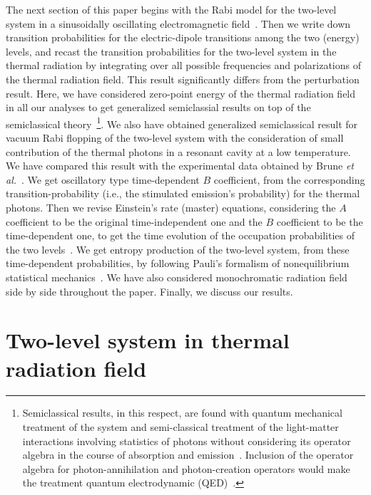 \documentclass[aps,pra,twocolumn,showpacs,preprintnumbers,amsmath,amssymb,footinbib]{revtex4}
\begin{document}
The next section of this paper begins with the Rabi model for the two-level system in a sinusoidally oscillating electromagnetic field~\cite{Rabi,Rabi2,Griffiths,Sakurai}. Then we write down transition probabilities for the electric-dipole transitions among the two (energy) levels, and recast the transition probabilities for the two-level system in the thermal radiation by integrating over all possible frequencies and polarizations of the thermal radiation field. This result significantly differs from the perturbation result. Here, we have considered zero-point energy of the thermal radiation field in all our analyses to get generalized semiclassial results on top of the semiclassical theory~\footnote{Semiclassical results, in this respect, are found with quantum mechanical treatment of the system and semi-classical treatment of the light-matter interactions involving statistics of photons without considering its operator algebra in the course of absorption and emission~\cite{Griffiths,Sakurai}. Inclusion of the operator algebra for photon-annihilation and photon-creation operators would make the treatment quantum electrodynamic (QED)~\cite{Jaynes}.}. We also have obtained generalized semiclassical result for vacuum Rabi flopping of the two-level system with the consideration of small contribution of the thermal photons in a resonant cavity at a low temperature. We have compared this result with the experimental data obtained by Brune \textit{et al.}~\cite{Brune}. We get oscillatory type time-dependent $B$ coefficient, from the corresponding transition-probability (i.e., the stimulated emission's probability) for the thermal photons. Then we revise Einstein's rate (master) equations, considering the $A$ coefficient to be the original time-independent one and the $B$ coefficient to be the time-dependent one, to get the time evolution of the occupation probabilities of the two levels~\cite{Einstein}. We get entropy production of the two-level system, from these time-dependent probabilities, by following Pauli's formalism of nonequilibrium statistical mechanics~\cite{Pauli,Feynman}. We have also considered monochromatic radiation field side by side throughout the paper. Finally, we discuss our results.
%
\section{Two-level system in thermal radiation field}
\end{document}
